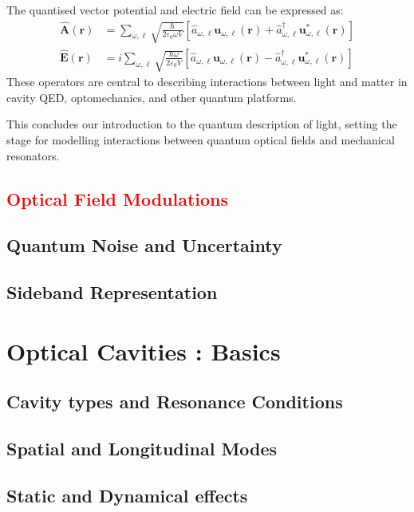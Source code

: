 The quantised vector potential and electric field can be expressed as:
\begin{align}
\hat{\mathbf{A}}(\mathbf{r}) &= \sum_{\omega,\ell} \sqrt{\frac{\hbar}{2\varepsilon_0 \omega V}} \left[ \hat{a}_{\omega,\ell} \mathbf{u}_{\omega,\ell}(\mathbf{r}) + \hat{a}_{\omega,\ell}^\dagger \mathbf{u}_{\omega,\ell}^*(\mathbf{r}) \right] \\
\hat{\mathbf{E}}(\mathbf{r}) &= i \sum_{\omega,\ell} \sqrt{\frac{\hbar \omega}{2\varepsilon_0 V}} \left[ \hat{a}_{\omega,\ell} \mathbf{u}_{\omega,\ell}(\mathbf{r}) - \hat{a}_{\omega,\ell}^\dagger \mathbf{u}_{\omega,\ell}^*(\mathbf{r}) \right]
\end{align}
These operators are central to describing interactions between light and matter in cavity QED, optomechanics, and other quantum platforms.

\vspace{1em}
This concludes our introduction to the quantum description of light, setting the stage for modelling interactions between quantum optical fields and mechanical resonators.

\subsection{\textcolor{red}{Optical Field Modulations}}
\subsection{Quantum Noise and Uncertainty}
\subsection{Sideband Representation}
\hspace{1pt}

\section{Optical Cavities : Basics}
\subsection{Cavity types and Resonance Conditions}
\subsection{Spatial and Longitudinal Modes}
\subsection{Static and Dynamical effects}
\hspace{1pt}

